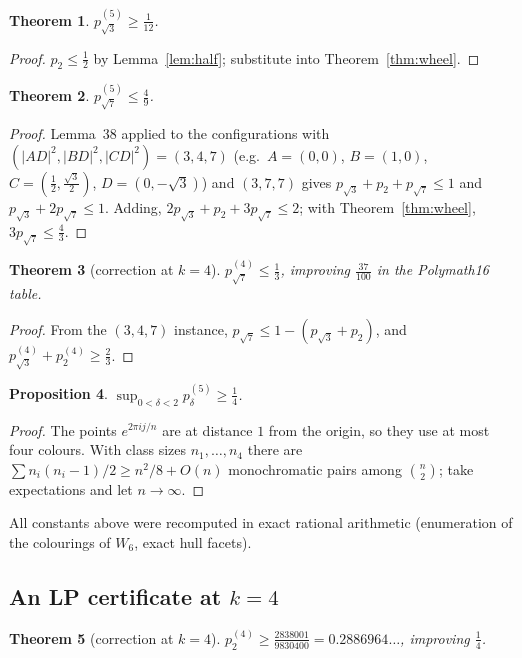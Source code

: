 \documentclass[11pt,a4paper]{amsart}
\newtheorem{theorem}{Theorem}[section]
\newtheorem{proposition}[theorem]{Proposition}
\theoremstyle{remark}
\begin{document}
\begin{theorem}\label{thm:p3five}
$p^{(5)}_{\sqrt3}\ge\tfrac1{12}$.
\end{theorem}
\begin{proof}
$p_2\le\tfrac12$ by Lemma~\ref{lem:half}; substitute into Theorem~\ref{thm:wheel}.
\end{proof}

\begin{theorem}\label{thm:p7five}
$p^{(5)}_{\sqrt7}\le\tfrac49$.
\end{theorem}
\begin{proof}
Lemma~38 applied to the configurations with $(|AD|^2,|BD|^2,|CD|^2)=(3,4,7)$ (e.g.\ $A=(0,0)$, $B=(1,0)$, $C=(\tfrac12,\tfrac{\sqrt3}2)$, $D=(0,-\sqrt3)$) and $(3,7,7)$ gives $p_{\sqrt3}+p_2+p_{\sqrt7}\le1$ and $p_{\sqrt3}+2p_{\sqrt7}\le1$. Adding, $2p_{\sqrt3}+p_2+3p_{\sqrt7}\le2$; with Theorem~\ref{thm:wheel}, $3p_{\sqrt7}\le\tfrac43$.
\end{proof}

\begin{theorem}[correction at $k=4$]\label{thm:p7four}
$p^{(4)}_{\sqrt7}\le\tfrac13$, improving $\tfrac{37}{100}$ in the Polymath16 table.
\end{theorem}
\begin{proof}
From the $(3,4,7)$ instance, $p_{\sqrt7}\le1-(p_{\sqrt3}+p_2)$, and $p^{(4)}_{\sqrt3}+p^{(4)}_2\ge\tfrac23$.
\end{proof}

\begin{proposition}\label{prop:sup}
$\sup_{0<\delta<2}p^{(5)}_\delta\ge\tfrac14$.
\end{proposition}
\begin{proof}
The points $e^{2\pi ij/n}$ are at distance $1$ from the origin, so they use at most four colours. With class sizes $n_1,\dots,n_4$ there are $\sum n_i(n_i-1)/2\ge n^2/8+O(n)$ monochromatic pairs among $\binom n2$; take expectations and let $n\to\infty$.
\end{proof}

All constants above were recomputed in exact rational arithmetic (enumeration of the colourings of $W_6$, exact hull facets).

\subsection{An LP certificate at $k=4$}

\begin{theorem}[correction at $k=4$]\label{thm:p2four}
$p^{(4)}_2\ge\tfrac{2838001}{9830400}=0.2886964\ldots$, improving $\tfrac14$.
\end{theorem}
\end{document}
